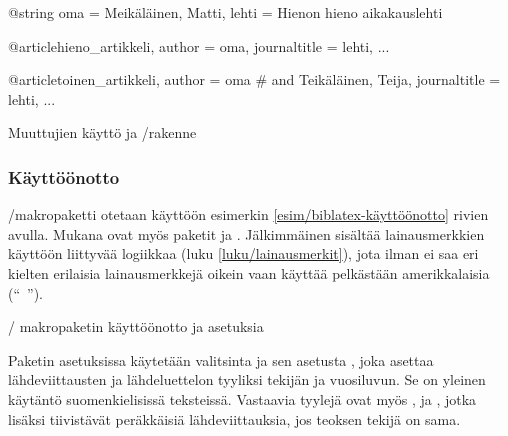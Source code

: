 \begin{esimerkki*}
\begin{koodilohko}
@string{
  oma = {Meikäläinen, Matti},
  lehti = {Hienon hieno aikakauslehti}
}

@article{hieno_artikkeli,
  author = oma,
  journaltitle = lehti,
  ...
}

@article{toinen_artikkeli,
  author = oma # { and Teikäläinen, Teija},
  journaltitle = lehti,
  ...
}
\end{koodilohko}
  \caption{Muuttujien käyttö ja \-/rakenne}
  \label{esim/bib-muuttujat}
\end{esimerkki*}

\subsubsection{Käyttöönotto}

\-/makropaketti otetaan käyttöön esimerkin
\ref{esim/biblatex-käyttöönotto} rivien avulla. Mukana ovat myös paketit
 ja . Jälkimmäinen sisältää
lainausmerkkien käyttöön liittyvää logiikkaa (luku
\ref{luku/lainausmerkit}), jota ilman  ei saa eri
kielten erilaisia lainausmerkkejä oikein vaan käyttää pelkästään
amerikkalaisia (``~'').

\begin{esimerkki*}

\begin{koodilohko}
\usepackage{polyglossia}

\usepackage{csquotes}

\usepackage[style=authoryear]{biblatex}
\end{koodilohko}
  \caption{\-/ makropaketin käyttöönotto ja asetuksia}
  \label{esim/biblatex-käyttöönotto}
\end{esimerkki*}

Paketin asetuksissa käytetään valitsinta  ja sen asetusta
, joka asettaa lähdeviittausten ja lähdeluettelon
tyyliksi tekijän ja vuosiluvun. Se on yleinen käytäntö suomenkielisissä
teksteissä. Vastaavia tyylejä ovat myös ,
 ja , jotka lisäksi
tiivistävät peräkkäisiä lähdeviittauksia, jos teoksen tekijä on sama.

